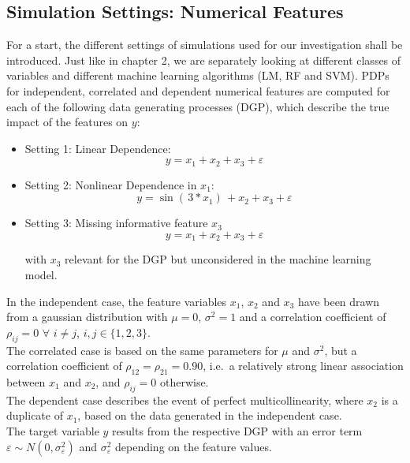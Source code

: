 \documentclass[]{krantz}
\providecommand{\tightlist}{%
  \setlength{\itemsep}{0pt}\setlength{\parskip}{0pt}}
\begin{document}
\subsection{Simulation Settings: Numerical
Features}\label{simulation-settings-numerical-features}

For a start, the different settings of simulations used for our
investigation shall be introduced. Just like in chapter 2, we are
separately looking at different classes of variables and different
machine learning algorithms (LM, RF and SVM). PDPs for independent,
correlated and dependent numerical features are computed for each of the
following data generating processes (DGP), which describe the true
impact of the features on \(y\):

\begin{itemize}
\tightlist
\item
  Setting 1: Linear Dependence:\\

  \begin{equation}
  y = x_1 + x_2 + x_3 + \varepsilon \label{eq:10}
  \end{equation}
\item
  Setting 2: Nonlinear Dependence in \(x_1\):\\

  \begin{equation}
  y = \sin{( \, 3*x_1 ) \,} + x_2 + x_3 + \varepsilon \label{eq:11}
  \end{equation}
\item
  Setting 3: Missing informative feature \(x_3\)\\

  \begin{equation}
  y = x_1 + x_2 + x_3 + \varepsilon \label{eq:12}
  \end{equation}

  with \(x_3\) relevant for the DGP but unconsidered in the machine
  learning model.
\end{itemize}

In the independent case, the feature variables \(x_1\), \(x_2\) and
\(x_3\) have been drawn from a gaussian distribution with \(\mu = 0\),
\(\sigma^2 = 1\) and a correlation coefficient of \(\rho_{ij} = 0\)
\(\forall\) \(i \ne j\), \(i,j \in \{1,2,3\}\).\\
The correlated case is based on the same parameters for \(\mu\) and
\(\sigma^2\), but a correlation coefficient of
\(\rho_{12} = \rho_{21} = 0.90\), i.e.~a relatively strong linear
association between \(x_1\) and \(x_2\), and \(\rho_{ij} = 0\)
otherwise.\\
The dependent case describes the event of perfect multicollinearity,
where \(x_2\) is a duplicate of \(x_1\), based on the data generated in
the independent case.\\
The target variable \(y\) results from the respective DGP with an error
term \(\varepsilon \sim N(0, \sigma^2_\varepsilon)\) and
\(\sigma^2_\varepsilon\) depending on the feature values.
\end{document}
